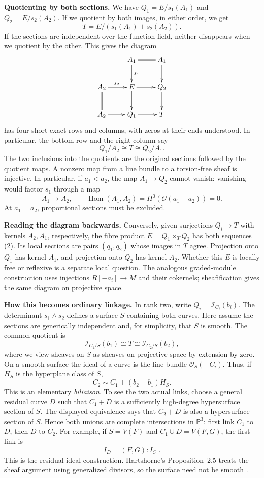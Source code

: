 \documentclass[11pt,a4paper]{article}
\theoremstyle{remark}
\begin{document}
\textbf{Quotienting by both sections.}
We have $Q_1=E/s_1(A_1)$ and
$Q_2=E/s_2(A_2)$. If we quotient by
both images, in either order, we get
$$
T=E/(s_1(A_1)+s_2(A_2)).
$$
If the sections are independent over
the function field, neither disappears
when we quotient by the other. This
gives the diagram
$$
\xymatrix{
&A_1\ar@{=}[r]\ar[d]^{s_1}&A_1\ar[d]\\
A_2\ar@{=}[d]\ar[r]^{s_2}
&E\ar[r]\ar[d]&Q_2\ar[d]\\
A_2\ar[r]&Q_1\ar[r]&T
}
$$
has four short exact rows and columns,
with zeros at their ends understood.
In particular, the bottom row and the
right column say
$$
Q_1/A_2\cong T\cong Q_2/A_1.
$$
The two inclusions into the quotients
are the original sections followed by
the quotient maps.
A nonzero map from a line bundle to a
torsion-free sheaf is injective.
In particular, if $a_1<a_2$, the map
$A_1\to Q_2$ cannot vanish: vanishing
would factor $s_1$ through a map
$$
A_1\longrightarrow A_2,
\qquad
\operatorname{Hom}(A_1,A_2)
=H^0(\mathcal{O}(a_1-a_2))=0.
$$
At $a_1=a_2$, proportional sections
must be excluded.

\textbf{Reading the diagram backwards.}
Conversely, given surjections $Q_i\to T$
with kernels $A_2,A_1$, respectively,
the fibre product $E=Q_1\times_TQ_2$
has both sequences (2). Its local
sections are pairs $(q_1,q_2)$ whose
images in $T$ agree. Projection onto
$Q_1$ has kernel $A_1$, and projection
onto $Q_2$ has kernel $A_2$.
Whether this $E$ is locally free or
reflexive is a separate local question.
The analogous graded-module construction
uses injections $R[-a_i]\to M$ and
their cokernels; sheafification gives
the same diagram on projective space.

\textbf{How this becomes ordinary linkage.}
In rank two, write
$Q_i=\mathcal{I}_{C_i}(b_i)$.
The determinant $s_1\wedge s_2$ defines
a surface $S$ containing both curves.
Here assume the sections are generically
independent and, for simplicity, that
$S$ is smooth. The common quotient is
$$
\mathcal{I}_{C_1/S}(b_1)
\cong T\cong\mathcal{I}_{C_2/S}(b_2),
$$
where we view sheaves on $S$ as sheaves
on projective space by extension by zero.
On a smooth surface the ideal of a
curve is the line bundle
$\mathcal{O}_S(-C_i)$. Thus, if $H_S$
is the hyperplane class of $S$,
$$
C_2\sim C_1+(b_2-b_1)H_S.
$$
This is an elementary \emph{biliaison}.
To see the two actual links, choose a
general residual curve $D$ such that
$C_1+D$ is a sufficiently high-degree
hypersurface section of $S$.
The displayed equivalence says that
$C_2+D$ is also a hypersurface section
of $S$. Hence both unions are complete
intersections in $\mathbb{P}^3$:
first link $C_1$ to $D$, then $D$ to
$C_2$. For example, if $S=V(F)$ and
$C_1\cup D=V(F,G)$, the first link is
$$
I_D=(F,G):I_{C_1}.
$$
This is the residual-ideal construction.
Hartshorne's Proposition~2.5 treats the
sheaf argument using generalized divisors,
so the surface need not be smooth
\cite{rao}.
\end{document}
